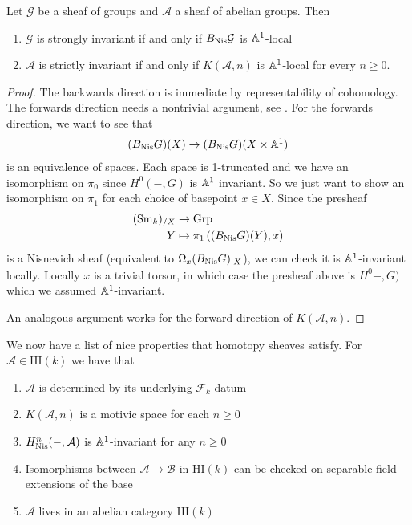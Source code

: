 \documentclass[11pt,openany]{book}
\providecommand{\HI}{\mathrm{HI}}
\begin{document}
\begin{proposition}\label{prop:strongly-strictly-redefined} 
Let $\mathcal{G}$ be a sheaf of groups and $\mathcal{A}$ a sheaf of abelian groups. Then
\begin{enumerate}
    \item $\mathcal{G}$ is strongly invariant if and only if $B_{\mathrm{Nis}} \mathcal{G}$ is $\mathbb{A}^1$-local
    \item $\mathcal{A}$ is strictly invariant if and only if $K(\mathcal{A},n)$ is $\mathbb{A}^1$-local for every $n\ge0$.
\end{enumerate}
\end{proposition}
\begin{proof} The backwards direction is immediate by representability of cohomology. The forwards direction needs a nontrivial argument, see \cite[1.5]{bachmannstrongly}.
For the forwards direction, we want to see that
\begin{align*}
    (B_{\mathrm{Nis}} G)(X) \to (B_{\mathrm{Nis}} G)(X \times \mathbb{A}^1)
\end{align*}
is an equivalence of spaces. Each space is 1-truncated and we have an isomorphism on $\pi_0$ since $H^0(-,G)$ is $\mathbb{A}^1$ invariant. So we just want to show an isomorphism on $\pi_1$ for each choice of basepoint $x\in X$. Since the presheaf
\begin{align*}
    (\mathrm{Sm}_k)_{/X} &\to \mathrm{Grp}\\
    Y &\mapsto \pi_1 \left( (B_{\mathrm{Nis}} G)(Y), x \right)
\end{align*}
is a Nisnevich sheaf (equivalent to $\Omega_x (B_{\mathrm{Nis}} G)_{|X}$), we can check it is $\mathbb{A}^1$-invariant locally. Locally $x$ is a trivial torsor, in which case the presheaf above is $H^0-,G)$ which we assumed $\mathbb{A}^1$-invariant.

An analogous argument works for the forward direction of $K(\mathcal{A},n)$.
\end{proof}

We now have a list of nice properties that homotopy sheaves satisfy. For $\mathcal{A} \in \HI(k)$ we have that
\begin{enumerate}
    \item $\mathcal{A}$ is determined by its underlying $\mathcal{F}_k$-datum
    \item $K(\mathcal{A},n)$ is a motivic space for each $n\ge0$
    \item $H_{\mathrm{Nis}}^n(-,\mathcal{A})$ is $\mathbb{A}^1$-invariant for any $n\ge 0$
    \item Isomorphisms between $\mathcal{A} \to \mathcal{B}$ in $\HI(k)$ can be checked on separable field extensions of the base
    \item $\mathcal{A}$ lives in an abelian category $\HI(k)$
\end{enumerate}
\end{document}
